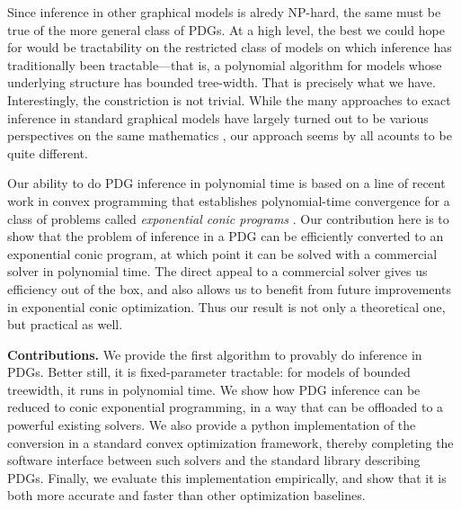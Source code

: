 \documentclass[twoside]{article}
\begin{document}
Since inference in other graphical models is alredy NP-hard, the same must be true of the more general class of PDGs.
At a high level, the best we could hope for would be tractability on the restricted
class of models on which inference has traditionally been tractable---that is, a polynomial algorithm for models whose underlying structure has bounded tree-width.
That is precisely what we have.
Interestingly, the constriction is not trivial.
%
While the many approaches to exact inference in standard graphical models have largely turned out to be various perspectives on the same mathematics \parencite[\S9-11]{koller2009probabilistic},
our approach seems by all acounts to be quite different.

Our ability to do PDG inference in polynomial time is based on a line of recent work in convex programming that establishes polynomial-time convergence
\parencite{badenbroek2021algorithm,dahl2022primal}
for a class of problems called \emph{exponential conic programs}
\parencite{lubin}.
Our contribution here is to show that the problem of inference in a PDG can be efficiently converted to an exponential conic program, at which point it can be solved with a commercial solver \parencite{mosek} in polynomial time.
The direct appeal to a commercial solver gives us efficiency out of the box, and also allows us to benefit from future improvements in exponential conic optimization.
Thus our result is not only a theoretical one, but practical as well.


\textbf{Contributions.}
We provide the first algorithm to provably do inference in PDGs.
Better still, it is fixed-parameter tractable: for models of bounded treewidth,
    it runs in polynomial time.
We show how PDG inference can be reduced to conic exponential programming,
    in a way that can be offloaded to a powerful existing solvers.
We also provide a python implementation of the conversion in a standard convex optimization framework, thereby completing the software interface between such solvers and the standard library describing PDGs.
Finally, we evaluate this implementation empirically, and show that it is both more accurate and faster than other optimization baselines.
%
\end{document}
